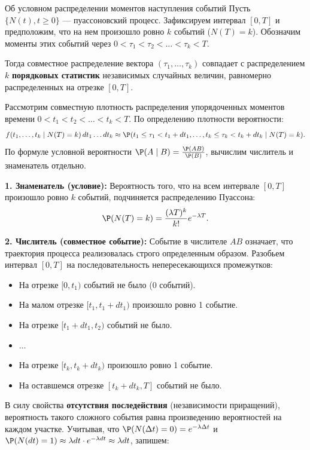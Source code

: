 \begin{theorem}{Об условном распределении моментов наступления событий}
Пусть $\{N(t), t \ge 0\}$ — пуассоновский процесс. Зафиксируем интервал $[0, T]$ и предположим, что на нем произошло ровно $k$ событий ($N(T) = k$). Обозначим моменты этих событий через $0 < \tau_1 < \tau_2 < \dots < \tau_k < T$.

Тогда совместное распределение вектора $(\tau_1, \dots, \tau_k)$ совпадает с распределением $k$ \textbf{порядковых статистик} независимых случайных величин, равномерно распределенных на отрезке $[0, T]$.
\end{theorem}

\begin{tproof}
Рассмотрим совместную плотность распределения упорядоченных моментов времени $0 < t_1 < t_2 < \dots < t_k < T$. По определению плотности вероятности:
$$
f(t_1, \dots, t_k \mid N(T)=k) \, dt_1 \dots dt_k \approx \P(t_1 \le \tau_1 < t_1 + dt_1, \dots, t_k \le \tau_k < t_k + dt_k \mid N(T) = k).
$$
По формуле условной вероятности $\P(A \mid B) = \frac{\P(AB)}{\P(B)}$, вычислим числитель и знаменатель отдельно.

\textbf{1. Знаменатель (условие):}
Вероятность того, что на всем интервале $[0, T]$ произошло ровно $k$ событий, подчиняется распределению Пуассона:
$$ \P(N(T) = k) = \frac{(\lambda T)^k}{k!} e^{-\lambda T}. $$

\textbf{2. Числитель (совместное событие):}
Событие в числителе $AB$ означает, что траектория процесса реализовалась строго определенным образом. Разобьем интервал $[0, T]$ на последовательность непересекающихся промежутков:
\begin{itemize}
    \item На отрезке $[0, t_1)$ событий не было (0 событий).
    \item На малом отрезке $[t_1, t_1 + dt_1)$ произошло ровно 1 событие.
    \item На отрезке $[t_1 + dt_1, t_2)$ событий не было.
    \item $\dots$
    \item На отрезке $[t_k, t_k + dt_k)$ произошло ровно 1 событие.
    \item На оставшемся отрезке $[t_k + dt_k, T]$ событий не было.
\end{itemize}

В силу свойства \textbf{отсутствия последействия} (независимости приращений), вероятность такого сложного события равна произведению вероятностей на каждом участке.
Учитывая, что $\P(N(\Delta t)=0) = e^{-\lambda \Delta t}$ и $\P(N(dt)=1) \approx \lambda dt \cdot e^{-\lambda dt} \approx \lambda dt$, запишем:


\end{tproof}
